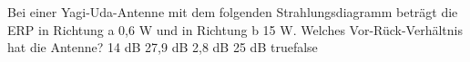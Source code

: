     {Bei einer Yagi-Uda-Antenne mit dem folgenden Strahlungsdiagramm beträgt die ERP in Richtung a 0,6 W und in Richtung b 15 W. Welches Vor-Rück-Verhältnis hat die Antenne?}
    {14 dB}
    {27,9 dB}
    {2,8 dB}
    {25 dB}
    {true}{false}
